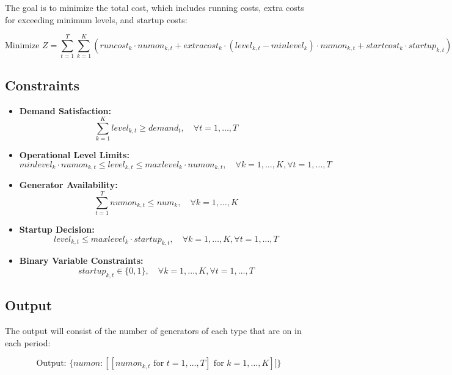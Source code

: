 \documentclass{article}
\begin{document}
The goal is to minimize the total cost, which includes running costs, extra costs for exceeding minimum levels, and startup costs:

\[
\text{Minimize } Z = \sum_{t=1}^{T} \sum_{k=1}^{K} \left( runcost_k \cdot numon_{k,t} + extracost_k \cdot (level_{k,t} - minlevel_k) \cdot numon_{k,t} + startcost_k \cdot startup_{k,t} \right)
\]

\subsection*{Constraints}

\begin{itemize}
    \item \textbf{Demand Satisfaction:}
    \[
    \sum_{k=1}^{K} level_{k,t} \geq demand_t, \quad \forall t = 1, \ldots, T
    \]

    \item \textbf{Operational Level Limits:}
    \[
    minlevel_k \cdot numon_{k,t} \leq level_{k,t} \leq maxlevel_k \cdot numon_{k,t}, \quad \forall k = 1, \ldots, K, \forall t = 1, \ldots, T
    \]

    \item \textbf{Generator Availability:}
    \[
    \sum_{t=1}^{T} numon_{k,t} \leq num_k, \quad \forall k = 1, \ldots, K
    \]

    \item \textbf{Startup Decision:}
    \[
    level_{k,t} \leq maxlevel_k \cdot startup_{k,t}, \quad \forall k = 1, \ldots, K, \forall t = 1, \ldots, T
    \]

    \item \textbf{Binary Variable Constraints:}
    \[
    startup_{k,t} \in \{0, 1\}, \quad \forall k = 1, \ldots, K, \forall t = 1, \ldots, T
    \]
\end{itemize}

\subsection*{Output}

The output will consist of the number of generators of each type that are on in each period:

\[
\text{Output: } \{ numon: [[numon_{k,t} \text{ for } t = 1, \ldots, T] \text{ for } k = 1, \ldots, K] ] \}
\]
\end{document}
